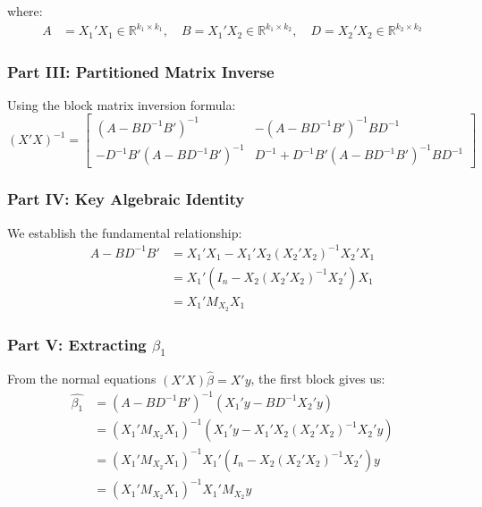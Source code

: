 \documentclass[11pt,letterpaper]{article}
\makeatletter
\theoremstyle{definition}
\newcommand{\R}{\mathbb{R}}
\renewenvironment{proof}[1][\proofname]{\par
  \pushQED{\qed}%
  \normalfont \topsep6\p@\@plus6\p@\relax
  \trivlist
  \item[\hskip\labelsep
        \itshape\bfseries\color{accentblue}
    #1\@addpunct{.}]\ignorespaces
}{%
  \popQED\endtrivlist\@endpefalse
}
\makeatother
\begin{document}
\begin{proof}
where:
\begin{align}
A &= X_1'X_1 \in \R^{k_1 \times k_1}, \quad B = X_1'X_2 \in \R^{k_1 \times k_2}, \quad D = X_2'X_2 \in \R^{k_2 \times k_2}
\end{align}

\subsubsection*{\textcolor{primaryblue}{Part III: Partitioned Matrix Inverse}}

Using the block matrix inversion formula:
\begin{equation}\label{eq:partitioned_inverse}
(X'X)^{-1} = \begin{bmatrix} 
(A - BD^{-1}B')^{-1} & -(A - BD^{-1}B')^{-1}BD^{-1} \\
-D^{-1}B'(A - BD^{-1}B')^{-1} & D^{-1} + D^{-1}B'(A - BD^{-1}B')^{-1}BD^{-1}
\end{bmatrix}
\end{equation}

\subsubsection*{\textcolor{primaryblue}{Part IV: Key Algebraic Identity}}

We establish the fundamental relationship:
\begin{align}
A - BD^{-1}B' &= X_1'X_1 - X_1'X_2(X_2'X_2)^{-1}X_2'X_1 \\
&= X_1'(I_n - X_2(X_2'X_2)^{-1}X_2')X_1 \\
&= X_1'M_{X_2}X_1 \label{eq:key_identity}
\end{align}

\subsubsection*{\textcolor{primaryblue}{Part V: Extracting $\hat{\beta_1}$}}

From the normal equations $(X'X)\hat{\beta} = X'y$, the first block gives us:
\begin{align}
\hat{\beta_1} &= (A - BD^{-1}B')^{-1}(X_1'y - BD^{-1}X_2'y) \\
&= (X_1'M_{X_2}X_1)^{-1}(X_1'y - X_1'X_2(X_2'X_2)^{-1}X_2'y) \\
&= (X_1'M_{X_2}X_1)^{-1}X_1'(I_n - X_2(X_2'X_2)^{-1}X_2')y \\
&= (X_1'M_{X_2}X_1)^{-1}X_1'M_{X_2}y \label{eq:beta1_full}
\end{align}


\end{proof}
\end{document}
